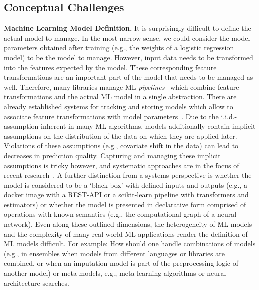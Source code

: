 \documentclass[11pt]{article}
\newcommand{\hdr}[1]{\noindent\textbf{#1.}}
\begin{document}
\subsection{Conceptual Challenges}
\label{sec:conceptual}

\hdr{Machine Learning Model Definition} It is surprisingly difficult to define the actual model to manage. In the most narrow sense, we could consider the model parameters obtained after training (e.g., the weights of a logistic regression model) to be the model to manage. However, input data needs to be transformed into the features expected by the model. These corresponding feature transformations are an important part of the model that needs to be managed as well. Therefore, many libraries manage ML \textit{pipelines}~\cite{Pedregosa2011,Meng2015} which combine feature transformations and the actual ML model in a single abstraction. There are already established systems for tracking and storing models which allow to associate feature transformations with model parameters~\cite{Vanschoren2014,Vartak2016,Schelter2017}. Due to the i.i.d.-assumption inherent in many ML algorithms, models additionally contain implicit assumptions on the distribution of the data on which they are applied later. Violations of these assumptions (e.g., covariate shift in the data) can lead to decreases in prediction quality. Capturing and managing these implicit assumptions is tricky however, and systematic approaches are in the focus of recent research~\cite{Baylor2017,Hynes2017,Schelter2018}. A further distinction from a systems perspective is whether the model is considered to be a `black-box' with defined inputs and outputs (e.g., a docker image with a REST-API or a scikit-learn pipeline with transformers and estimators) or whether the model is presented in declarative form comprised of operations with known semantics (e.g., the computational graph of a neural network). Even along these outlined dimensions, the heterogeneity of ML models and the complexity of many real-world ML applications render the definition of ML models difficult. For example: How should one handle combinations of models (e.g., in ensembles when models from different languages or libraries are combined, or when an imputation model is part of the preprocessing logic of another model) or meta-models, e.g., meta-learning algorithms or neural architecture searches.\\
\end{document}
